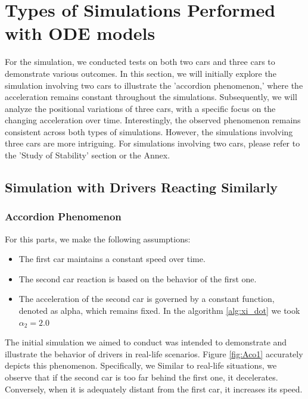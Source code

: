 \documentclass{article}
\begin{document}
		
	
	
	
	
	\section{Types of Simulations Performed with ODE models}
	
	For the simulation, we conducted tests on both two cars and three cars to demonstrate various outcomes. In this section, we will initially explore the simulation involving two cars to illustrate the 'accordion phenomenon,' where the acceleration remains constant throughout the simulations. Subsequently, we will analyze the positional variations of three cars, with a specific focus on the changing acceleration over time. Interestingly, the observed phenomenon remains consistent across both types of simulations. However, the simulations involving three cars are more intriguing. For simulations involving two cars, please refer to the 'Study of Stability' section or the Annex.
	
	\subsection{Simulation with Drivers Reacting Similarly}
		\subsubsection{Accordion Phenomenon}
		
		For this parts, we make the following assumptions:
		
		\begin{itemize}
			\item The first car maintains a constant speed over time.
			\item The second car reaction is based on the behavior of the first one.
			\item The acceleration of the second car is governed by a constant function, denoted as alpha, which remains fixed. In the algorithm \ref{alg:xi_dot} we took $\alpha_2=2.0$
		\end{itemize} 
		
		The initial simulation we aimed to conduct was intended to demonstrate and illustrate the behavior of drivers in real-life scenarios. Figure \ref{fig:Aco1} accurately depicts this phenomenon. Specifically, we Similar to real-life situations, we observe that if the second car is too far behind the first one, it decelerates. Conversely, when it is adequately distant from the first car, it increases its speed.
		
\end{document}
